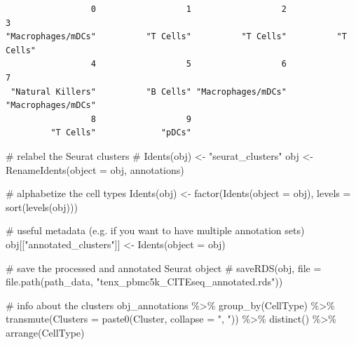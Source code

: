 \documentclass[
  letterpaper,
  DIV=11,
  numbers=noendperiod]{scrartcl}
\newenvironment{Shaded}{\begin{snugshade}}{\end{snugshade}}
\newcommand{\AttributeTok}[1]{\textcolor[rgb]{0.40,0.45,0.13}{#1}}
\newcommand{\CommentTok}[1]{\textcolor[rgb]{0.37,0.37,0.37}{#1}}
\newcommand{\FunctionTok}[1]{\textcolor[rgb]{0.28,0.35,0.67}{#1}}
\newcommand{\NormalTok}[1]{\textcolor[rgb]{0.00,0.23,0.31}{#1}}
\newcommand{\OtherTok}[1]{\textcolor[rgb]{0.00,0.23,0.31}{#1}}
\newcommand{\SpecialCharTok}[1]{\textcolor[rgb]{0.37,0.37,0.37}{#1}}
\newcommand{\StringTok}[1]{\textcolor[rgb]{0.13,0.47,0.30}{#1}}
\begin{document}
\begin{Shaded}
\end{Shaded}

\begin{verbatim}
                 0                  1                  2                  3 
"Macrophages/mDCs"          "T Cells"          "T Cells"          "T Cells" 
                 4                  5                  6                  7 
 "Natural Killers"          "B Cells" "Macrophages/mDCs" "Macrophages/mDCs" 
                 8                  9 
         "T Cells"             "pDCs" 
\end{verbatim}

\begin{Shaded}
\begin{Highlighting}[]
\CommentTok{\# relabel the Seurat clusters}
\CommentTok{\# Idents(obj) \textless{}{-} "seurat\_clusters"}
\NormalTok{obj }\OtherTok{\textless{}{-}} \FunctionTok{RenameIdents}\NormalTok{(}\AttributeTok{object =}\NormalTok{ obj, annotations)}

\CommentTok{\# alphabetize the cell types}
\FunctionTok{Idents}\NormalTok{(obj) }\OtherTok{\textless{}{-}} \FunctionTok{factor}\NormalTok{(}\FunctionTok{Idents}\NormalTok{(}\AttributeTok{object =}\NormalTok{ obj), }\AttributeTok{levels =} \FunctionTok{sort}\NormalTok{(}\FunctionTok{levels}\NormalTok{(obj)))}

\CommentTok{\# useful metadata (e.g. if you want to have multiple annotation sets)}
\NormalTok{obj[[}\StringTok{"annotated\_clusters"}\NormalTok{]] }\OtherTok{\textless{}{-}} \FunctionTok{Idents}\NormalTok{(}\AttributeTok{object =}\NormalTok{ obj)}

\CommentTok{\# save the processed and annotated Seurat object}
\CommentTok{\# saveRDS(obj, file = file.path(path\_data, "tenx\_pbmc5k\_CITEseq\_annotated.rds"))}

\CommentTok{\# info about the clusters}
\NormalTok{obj\_annotations }\SpecialCharTok{\%\textgreater{}\%}
  \FunctionTok{group\_by}\NormalTok{(CellType) }\SpecialCharTok{\%\textgreater{}\%}
  \FunctionTok{transmute}\NormalTok{(}\AttributeTok{Clusters =} \FunctionTok{paste0}\NormalTok{(Cluster, }\AttributeTok{collapse =} \StringTok{", "}\NormalTok{)) }\SpecialCharTok{\%\textgreater{}\%}
  \FunctionTok{distinct}\NormalTok{() }\SpecialCharTok{\%\textgreater{}\%}
  \FunctionTok{arrange}\NormalTok{(CellType)}
\end{Highlighting}
\end{Shaded}
\end{document}
